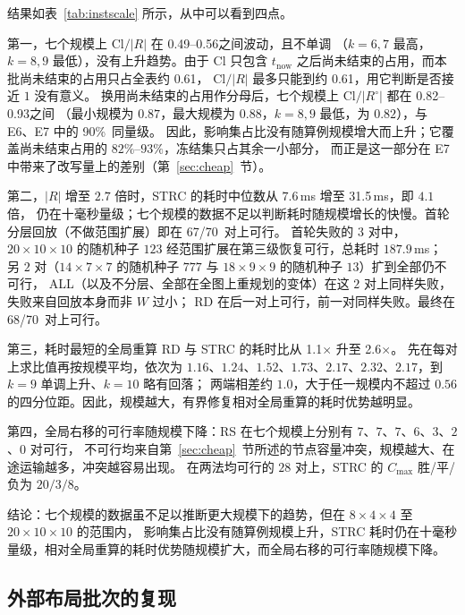 \documentclass[manuscript,screen,review]{acmart}
\providecommand{\STRC}{\textsc{STRC}}
\newcommand{\ClosureAliveFrac}{90\%}
\newcommand{\ScalePairs}{70}
\newcommand{\ScaleJobsHi}{20}
\newcommand{\ScaleMachHi}{10}
\newcommand{\ScaleCloLo}{0.49}       %
\newcommand{\ScaleCloHi}{0.56}       %
\newcommand{\ScaleAliveShare}{0.61}  %
\newcommand{\ScaleCloAliveLo}{0.82}  %
\newcommand{\ScaleCloAliveHi}{0.93}  %
\newcommand{\ScaleMsHi}{31.5}        %
\newcommand{\ScaleRatioLo}{1.1}      %
\newcommand{\ScaleRatioHi}{2.6}      %
\newcommand{\ScaleFeasFirst}{67/\ScalePairs}   %
\newcommand{\ScaleFeasAll}{68/\ScalePairs}     %
\begin{document}
结果如表~\ref{tab:instscale} 所示，从中可以看到四点。

第一，七个规模上 \(\mathrm{Cl}/|R|\) 在 \ScaleCloLo--\ScaleCloHi 之间波动，且不单调
（\(k=6,7\) 最高，\(k=8,9\) 最低），没有上升趋势。由于 \(\mathrm{Cl}\) 只包含
\(t_{\mathrm{now}}\) 之后尚未结束的占用，而本批尚未结束的占用只占全表约 \ScaleAliveShare，
\(\mathrm{Cl}/|R|\) 最多只能到约 \ScaleAliveShare，用它判断是否接近 \(1\) 没有意义。
换用尚未结束的占用作分母后，七个规模上 \(\mathrm{Cl}/|R^{\circ}|\) 都在 \ScaleCloAliveLo--\ScaleCloAliveHi 之间
（最小规模为 \(0.87\)，最大规模为 \(0.88\)，\(k=8,9\) 最低，为 \(0.82\)），与 E6、E7 中的 \ClosureAliveFrac\ 同量级。
因此，影响集占比没有随算例规模增大而上升；它覆盖尚未结束占用的 \(82\%\)--\(93\%\)，冻结集只占其余一小部分，
而正是这一部分在 E7 中带来了改写量上的差别（第~\ref{sec:cheap}~节）。

第二，\(|R|\) 增至 \(2.7\) 倍时，\STRC{} 的耗时中位数从 \(7.6\)\,ms 增至 \ScaleMsHi\,ms，即 \(4.1\) 倍，
仍在十毫秒量级；七个规模的数据不足以判断耗时随规模增长的快慢。首轮分层回放（不做范围扩展）即在 \ScaleFeasFirst\ 对上可行。
首轮失败的 \(3\) 对中，\(20\times10\times10\) 的随机种子 \(123\) 经范围扩展在第三级恢复可行，总耗时 \(187.9\)\,ms；
另 \(2\) 对（\(14\times7\times7\) 的随机种子 \(777\) 与 \(18\times9\times9\) 的随机种子 \(13\)）扩到全部仍不可行，
ALL（以及不分层、全部在全图上重规划的变体）在这 \(2\) 对上同样失败，失败来自回放本身而非 \(W\) 过小；
RD 在后一对上可行，前一对同样失败。最终在 \ScaleFeasAll\ 对上可行。

第三，耗时最短的全局重算 RD 与 \STRC{} 的耗时比从 \ScaleRatioLo\(\times\) 升至 \ScaleRatioHi\(\times\)。
先在每对上求比值再按规模平均，依次为 \(1.16\)、\(1.24\)、\(1.52\)、\(1.73\)、\(2.17\)、\(2.32\)、\(2.17\)，到 \(k=9\) 单调上升、\(k=10\) 略有回落；
两端相差约 \(1.0\)，大于任一规模内不超过 \(0.56\) 的四分位距。因此，规模越大，有界修复相对全局重算的耗时优势越明显。

第四，全局右移的可行率随规模下降：RS 在七个规模上分别有 \(7\)、\(7\)、\(7\)、\(6\)、\(3\)、\(2\)、\(0\) 对可行，
不可行均来自第~\ref{sec:cheap}~节所述的节点容量冲突，规模越大、在途运输越多，冲突越容易出现。
在两法均可行的 \(28\) 对上，\STRC{} 的 \(C_{\max}\) 胜/平/负为 \(20/3/8\)。

结论：七个规模的数据虽不足以推断更大规模下的趋势，但在 \(8\times4\times4\) 至 \(\ScaleJobsHi\times\ScaleMachHi\times\ScaleMachHi\) 的范围内，
影响集占比没有随算例规模上升，\STRC{} 耗时仍在十毫秒量级，相对全局重算的耗时优势随规模扩大，而全局右移的可行率随规模下降。

\subsection{外部布局批次的复现}
\label{sec:pubrepro}
\end{document}
